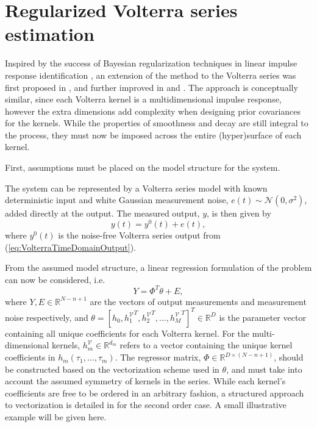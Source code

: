 \section{Regularized Volterra series estimation}
\label{sec:RegVolterraTD}

Inspired by the success of Bayesian regularization techniques in linear impulse response identification \cite{Pillonetto2010}, an extension of the method to the Volterra series was first proposed in \cite{Birpoutsoukis2015}, and further improved in \cite{Birpoutsoukis2017} and \cite{Birpoutsoukis2017c}. The approach is conceptually similar, since each Volterra kernel is a multidimensional impulse response, however the extra dimensions add complexity when designing prior covariances for the kernels. While the properties of smoothness and decay are still integral to the process, they must now be imposed across the entire (hyper)surface of each kernel.

First, assumptions must be placed on the model structure for the system.
\begin{assum}
\label{ass:ReLSmodelstructure}
The system can be represented by a Volterra series model with known deterministic input and white Gaussian measurement noise, $e(t) \sim \mathcal{N}(0,\sigma^2)$, added directly at the output. The measured output, $y$, is then given by 
\begin{equation}
\label{eq:ReLS_VolterraModelStructure}
y(t) = y^0(t) + e(t),
\end{equation} 
where $y^0(t)$ is the noise-free Volterra series output from (\ref{eq:VolterraTimeDomainOutput}). 
\end{assum}

From the assumed model structure, a linear regression formulation of the problem can now be considered, i.e.
\begin{equation}
\label{eq:VolterraRegressionForm}
Y = \Phi^T \theta + E,
\end{equation}
where $Y, E \in \mathbb{R}^{N-n+1}$ are the vectors of output measurements and measurement noise respectively, and $\theta = [h_0, {h_1^\mathcal{V}}^T, {h_2^\mathcal{V}}^T, \hdots, {h_M^\mathcal{V}}^T]^T \in \mathbb{R}^D$ is the parameter vector containing all unique coefficients for each Volterra kernel. For the multi-dimensional kernels, $h_m^\mathcal{V} \in \mathbb{R}^{d_m}$ refers to a vector containing the unique kernel coefficients in $h_m(\tau_1,\hdots, \tau_m)$. The regressor matrix, $\Phi \in \mathbb{R}^{D \times (N-n+1)}$, should be constructed based on the vectorization scheme used in $\theta$, and must take into account the assumed symmetry of kernels in the series. While each kernel's coefficients are free to be ordered in an arbitrary fashion, a structured approach to vectorization is detailed in \cite{Birpoutsoukis2017} for the second order case. A small illustrative example will be given here.   

